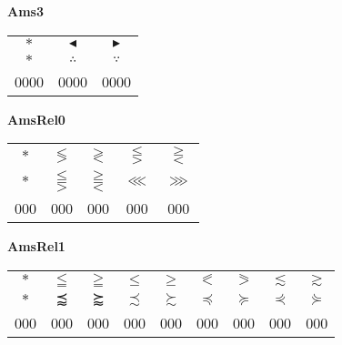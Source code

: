 \documentclass[12pt]{report}
\newlength{\mine}
\newlength{\niz}
\def\pmb{}
\begin{document}
\textbf{Ams3}
\par\nobreak\vspace{2mm}
\begin{tabular}{|c|cc|}
  \hline
   $\pmb *$&
   $\pmb\blacktriangleleft $&
   $\pmb\blacktriangleright $\\[\mine]
   $\pmb *$&
   $\pmb\therefore $&
   $\pmb\because $\\[\niz]
  \hline\hline
  0000&0000&0000\\
  \hline
\end{tabular}
\goodbreak\par\vspace{3mm}

\newpage

\textbf{AmsRel0}
\par\nobreak\vspace{2mm}
\begin{tabular}{|c|cccc|}
  \hline
   $\pmb *$&
   $\pmb\lessgtr $&
   $\pmb\gtrless $&
   $\pmb\lesseqgtr $&
   $\pmb\gtreqless $\\[\mine]
   $\pmb *$&
   $\pmb\lesseqqgtr $&
   $\pmb\gtreqqless $&
   $\pmb\lll $&
   $\pmb\ggg $\\[\niz]
  \hline\hline
  000&000&000&000&000\\
  \hline
\end{tabular}
\goodbreak\par\vspace{3mm}

\textbf{AmsRel1}
\par\nobreak\vspace{2mm}
\begin{tabular}{|c|cccccccc|}
  \hline
   $\pmb *$&
   $\pmb\leqq $&
   $\pmb\geqq $&
   $\pmb\leqslant $&
   $\pmb\geqslant $&
   $\pmb\eqslantless $&
   $\pmb\eqslantgtr $&
   $\pmb\lesssim $&
   $\pmb\gtrsim $\\[\mine]
   $\pmb *$&
   $\pmb\precapprox $&
   $\pmb\succapprox $&
   $\pmb\precsim $&
   $\pmb\succsim $&
   $\pmb\preccurlyeq $&
   $\pmb\succcurlyeq $&
   $\pmb\curlyeqprec $&
   $\pmb\curlyeqsucc $\\[\niz]
  \hline\hline
  000&000&000&000&000&000&000&000&000\\
  \hline
\end{tabular}
\goodbreak\par\vspace{3mm}
\end{document}
